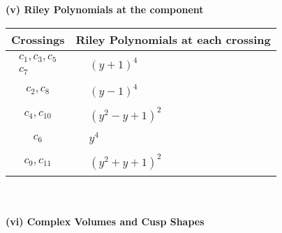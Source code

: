 \documentclass[1p]{elsarticle_modified}
\theoremstyle{definition}
\begin{document}
\newpage\renewcommand{\arraystretch}{1}
\flushleft \textbf{(v) Riley Polynomials at the component}\newline \\
\begin{tabular}{m{50pt}|m{274pt}}
Crossings & \hspace{64pt}Riley Polynomials at each crossing \\
\hline $$\begin{aligned}c_{1},c_{3},c_{5}\\c_{7}\end{aligned}$$&$\begin{aligned}
&(y+1)^4
\end{aligned}$\\
\hline $$\begin{aligned}c_{2},c_{8}\end{aligned}$$&$\begin{aligned}
&(y-1)^4
\end{aligned}$\\
\hline $$\begin{aligned}c_{4},c_{10}\end{aligned}$$&$\begin{aligned}
&(y^2- y+1)^2
\end{aligned}$\\
\hline $$\begin{aligned}c_{6}\end{aligned}$$&$\begin{aligned}
&y^4
\end{aligned}$\\
\hline $$\begin{aligned}c_{9},c_{11}\end{aligned}$$&$\begin{aligned}
&(y^2+y+1)^2
\end{aligned}$\\
\hline
\end{tabular}\\~\\
\newpage\flushleft \textbf{(vi) Complex Volumes and Cusp Shapes}
\end{document}

